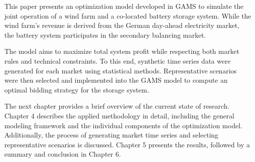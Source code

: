 This paper presents an optimization model developed in GAMS to simulate the joint operation of
a wind farm and a co-located battery storage system. While the wind farm's revenue is derived
from the German day-ahead electricity market, the battery system participates in the
secondary balancing market.

The model aims to maximize total system profit while respecting both market rules
and technical constraints. To this end, synthetic time series data were generated for each market using statistical methods.
Representative scenarios were then selected and implemented into the GAMS model to compute
an optimal bidding strategy for the storage system.

The next chapter provides a brief overview of the current state of research.
Chapter 4 describes the applied methodology in detail, including the general modeling framework
and the individual components of the optimization model.
Additionally, the process of generating market time series and selecting representative scenarios
is discussed. Chapter 5 presents the results, followed by a summary and conclusion in Chapter 6.
